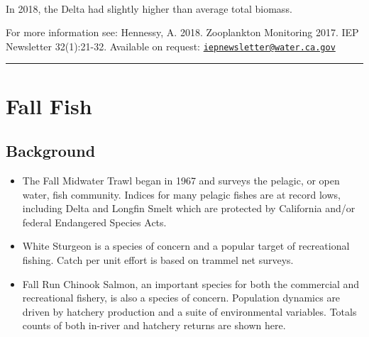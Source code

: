 \documentclass[
]{book}
\providecommand{\tightlist}{%
  \setlength{\itemsep}{0pt}\setlength{\parskip}{0pt}}
\begin{document}
\begin{panel-grid}
\begin{columns-nocenter}
\begin{column800}
\end{column800}

\begin{column40}

~

\end{column40}

\begin{column800}

In 2018, the Delta had slightly higher than average total biomass.

\end{column800}

\end{columns-nocenter}

\end{panel-grid}

\begin{disclaimer}
For more information see: Hennessy, A. 2018. Zooplankton Monitoring
2017. IEP Newsletter 32(1):21-32. Available on request:
\href{mailto:iepnewsletter@water.ca.gov}{\nolinkurl{iepnewsletter@water.ca.gov}}
\end{disclaimer}

\begin{center}\rule{0.5\linewidth}{0.5pt}\end{center}

\hypertarget{fall-fish}{%
\section{Fall Fish}\label{fall-fish}}

\hypertarget{background-4}{%
\subsection{Background}\label{background-4}}

\begin{itemize}
\tightlist
\item
  The Fall Midwater Trawl began in 1967 and surveys the pelagic, or open water, fish community. Indices for many pelagic fishes are at record lows, including Delta and Longfin Smelt which are protected by California and/or federal Endangered Species Acts.
\item
  White Sturgeon is a species of concern and a popular target of recreational fishing. Catch per unit
  effort is based on trammel net surveys.
\item
  Fall Run Chinook Salmon, an important species for both the commercial and recreational fishery, is also a species of concern. Population dynamics are driven by hatchery production and a suite of environmental variables. Totals counts of both in-river and hatchery returns are shown here.
\end{itemize}
\end{document}
